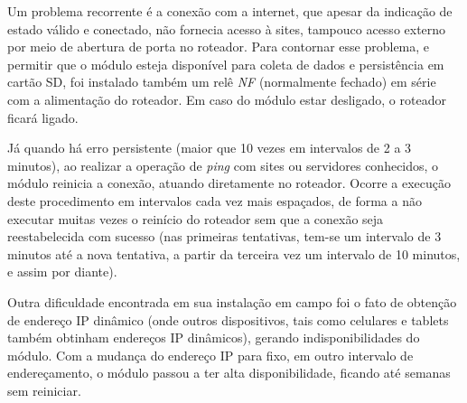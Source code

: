 Um problema recorrente é a conexão com a internet, que apesar da indicação de estado válido e conectado, não fornecia acesso à sites, tampouco acesso externo por meio de abertura de porta no roteador. Para contornar esse problema, e permitir que o módulo esteja disponível para coleta de dados e persistência em cartão SD, foi instalado também um relê \emph{NF} (normalmente fechado) em série com a alimentação do roteador. Em caso do módulo estar desligado, o roteador ficará ligado.

Já quando há erro persistente (maior que 10 vezes em intervalos de 2 a 3 minutos), ao realizar a operação de \emph{ping} com sites ou servidores conhecidos, o módulo reinicia a conexão, atuando diretamente no roteador. Ocorre a execução deste procedimento em intervalos cada vez mais espaçados, de forma a não executar muitas vezes o reinício do roteador sem que a conexão seja reestabelecida com sucesso (nas primeiras tentativas, tem-se um intervalo de 3 minutos até a nova tentativa, a partir da terceira vez um intervalo de 10 minutos, e assim por diante).

Outra dificuldade encontrada em sua instalação em campo foi o fato de obtenção de endereço IP dinâmico (onde outros dispositivos, tais como celulares e tablets também obtinham endereços IP dinâmicos), gerando indisponibilidades do módulo. Com a mudança do endereço IP para fixo, em outro intervalo de endereçamento, o módulo passou a ter alta disponibilidade, ficando até semanas sem reiniciar.
